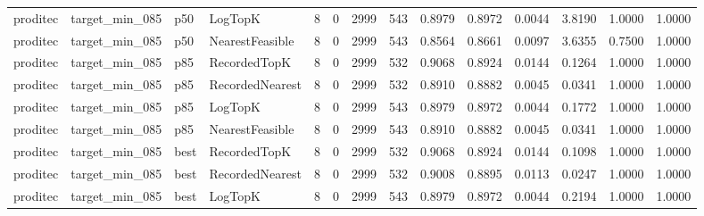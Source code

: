 \begin{tabular}{llllrrrrrrrrrr}
proditec &       target\_min\_085 &    p50 &         LogTopK &           8 &          0 &           2999 &                 543 &         0.8979 &          0.8972 &                    0.0044 &         3.8190 &                 1.0000 &                  1.0000 \\
proditec &       target\_min\_085 &    p50 & NearestFeasible &           8 &          0 &           2999 &                 543 &         0.8564 &          0.8661 &                    0.0097 &         3.6355 &                 0.7500 &                  1.0000 \\
proditec &       target\_min\_085 &    p85 &    RecordedTopK &           8 &          0 &           2999 &                 532 &         0.9068 &          0.8924 &                    0.0144 &         0.1264 &                 1.0000 &                  1.0000 \\
proditec &       target\_min\_085 &    p85 & RecordedNearest &           8 &          0 &           2999 &                 532 &         0.8910 &          0.8882 &                    0.0045 &         0.0341 &                 1.0000 &                  1.0000 \\
proditec &       target\_min\_085 &    p85 &         LogTopK &           8 &          0 &           2999 &                 543 &         0.8979 &          0.8972 &                    0.0044 &         0.1772 &                 1.0000 &                  1.0000 \\
proditec &       target\_min\_085 &    p85 & NearestFeasible &           8 &          0 &           2999 &                 543 &         0.8910 &          0.8882 &                    0.0045 &         0.0341 &                 1.0000 &                  1.0000 \\
proditec &       target\_min\_085 &   best &    RecordedTopK &           8 &          0 &           2999 &                 532 &         0.9068 &          0.8924 &                    0.0144 &         0.1098 &                 1.0000 &                  1.0000 \\
proditec &       target\_min\_085 &   best & RecordedNearest &           8 &          0 &           2999 &                 532 &         0.9008 &          0.8895 &                    0.0113 &         0.0247 &                 1.0000 &                  1.0000 \\
proditec &       target\_min\_085 &   best &         LogTopK &           8 &          0 &           2999 &                 543 &         0.8979 &          0.8972 &                    0.0044 &         0.2194 &                 1.0000 &                  1.0000 \\

\end{tabular}
